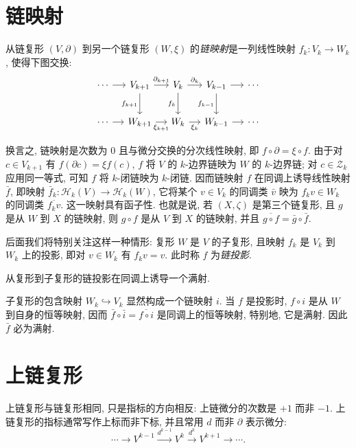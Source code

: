 \section{链映射}\label{sec:chain-maps}

从链复形 $(V,\partial)$ 到另一个链复形 $(W,\xi)$ 的\emph{链映射}是一列线性映射 $f_k:V_k\to W_k$, 使得下图交换:
\[
\begin{tikzcd}[column sep=1.2em,row sep=2.2em]
\cdots \arrow[r] & V_{k+1} \arrow[r,"\partial_{k+1}"] \arrow[d,"f_{k+1}"'] & V_k \arrow[r,"\partial_k"] \arrow[d,"f_k"'] & V_{k-1} \arrow[r] \arrow[d,"f_{k-1}"'] & \cdots \\
\cdots \arrow[r] & W_{k+1} \arrow[r,"\xi_{k+1}"'] & W_k \arrow[r,"\xi_k"'] & W_{k-1} \arrow[r] & \cdots
\end{tikzcd}
\]

换言之, 链映射是次数为 0 且与微分交换的分次线性映射, 即 $f\circ\partial=\xi\circ f$. 由于对 $c\in V_{k+1}$ 有 $f(\partial c)=\xi f(c)$, $f$ 将 $V$ 的 $k$-边界链映为 $W$ 的 $k$-边界链; 对 $c\in\mathcal Z_k$ 应用同一等式, 可知 $f$ 将 $k$-闭链映为 $k$-闭链. 因而链映射 $f$ 在同调上诱导线性映射 $\bar f$, 即映射 $\bar f_k:\mathcal H_k(V)\to\mathcal H_k(W)$, 它将某个 $v\in V_k$ 的同调类 $\bar v$ 映为 $f_kv\in W_k$ 的同调类 $\overline{f_kv}$. 这一映射具有函子性. 也就是说, 若 $(X,\zeta)$ 是第三个链复形, 且 $g$ 是从 $W$ 到 $X$ 的链映射, 则 $g\circ f$ 是从 $V$ 到 $X$ 的链映射, 并且 $\overline{g\circ f}=\bar g\circ\bar f$.

后面我们将特别关注这样一种情形: 复形 $W$ 是 $V$ 的子复形, 且映射 $f_k$ 是 $V_k$ 到 $W_k$ 上的投影, 即对 $v\in W_k$ 有 $f_kv=v$. 此时称 $f$ 为\emph{链投影}.

\begin{Proposition}\label{prop:chain-projection-homology-surjection}
从复形到子复形的链投影在同调上诱导一个满射.
\end{Proposition}

\begin{Proof}
子复形的包含映射 $W_k\hookrightarrow V_k$ 显然构成一个链映射 $i$. 当 $f$ 是投影时, $f\circ i$ 是从 $W$ 到自身的恒等映射, 因而 $\bar f\circ\bar i=\overline{f\circ i}$ 是同调上的恒等映射, 特别地, 它是满射. 因此 $\bar f$ 必为满射.
\end{Proof}

\section{上链复形}\label{sec:cochain-complexes}

上链复形与链复形相同, 只是指标的方向相反: 上链微分的次数是 $+1$ 而非 $-1$. 上链复形的指标通常写作上标而非下标, 并且常用 $d$ 而非 $\partial$ 表示微分:
\[
\cdots\to V^{k-1}\xrightarrow{d^{k-1}}V^k\xrightarrow{d^k}V^{k+1}\to\cdots.
\]


